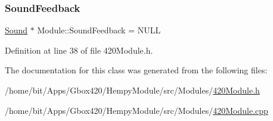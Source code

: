\subsubsection{\texorpdfstring{Sound\+Feedback}{SoundFeedback}}
{\footnotesize\ttfamily \hyperlink{class_sound}{Sound} $\ast$ Module\+::\+Sound\+Feedback = N\+U\+LL\hspace{0.3cm}{\ttfamily [protected]}}



Definition at line 38 of file 420\+Module.\+h.



The documentation for this class was generated from the following files\+:\begin{DoxyCompactItemize}
\item 
/home/bit/\+Apps/\+Gbox420/\+Hempy\+Module/src/\+Modules/\hyperlink{_hempy_module_2src_2_modules_2420_module_8h}{420\+Module.\+h}\item 
/home/bit/\+Apps/\+Gbox420/\+Hempy\+Module/src/\+Modules/\hyperlink{_hempy_module_2src_2_modules_2420_module_8cpp}{420\+Module.\+cpp}\end{DoxyCompactItemize}
